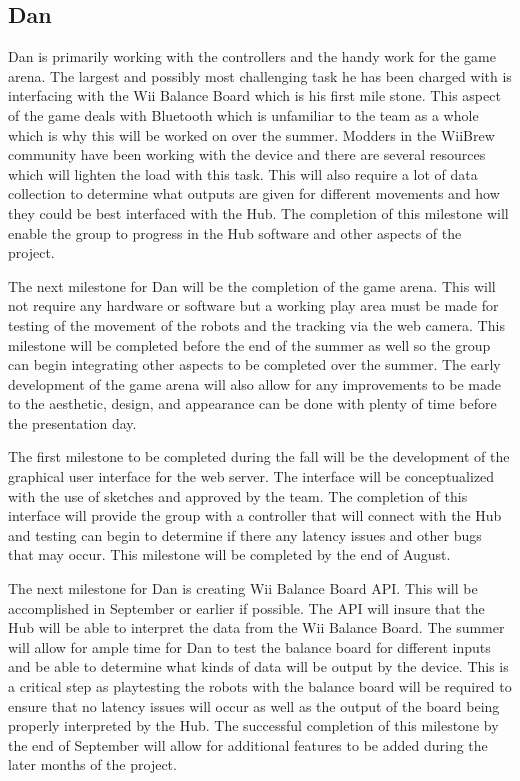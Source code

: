 \documentclass[11pt]{ieeeconf}
\begin{document}
\subsection{Dan}

Dan is primarily working with the controllers and the handy work for the game arena. The largest and possibly most challenging task he has been charged with is interfacing with the Wii Balance Board which is his first mile stone. This aspect of the game deals with Bluetooth which is unfamiliar to the team as a whole which is why this will be worked on over the summer. Modders in the WiiBrew \cite{homebrew} community have been working with the device and there are several resources which will lighten the load with this task. This will also require a lot of data collection to determine what outputs are given for different movements and how they could be best interfaced with the Hub. The completion of this milestone will enable the group to progress in the Hub software and other aspects of the project.

The next milestone for Dan will be the completion of the game arena. This will not require any hardware or software but a working play area must be made for testing of the movement of the robots and the tracking via the web camera. This milestone will be completed before the end of the summer as well so the group can begin integrating other aspects to be completed over the summer. The early development of the game arena will also allow for any improvements to be made to the aesthetic, design, and appearance can be done with plenty of time before the presentation day.

The first milestone to be completed during the fall will be the development of the graphical user interface for the web server. The interface will be conceptualized with the use of sketches and approved by the team. The completion of this interface will provide the group with a controller that will connect with the Hub and testing can begin to determine if there any latency issues and other bugs that may occur. This milestone will be completed by the end of August.  

The next milestone for Dan is creating Wii Balance Board API. This will be accomplished in September or earlier if possible. The API will insure that the Hub will be able to interpret the data from the Wii Balance Board. The summer will allow for ample time for Dan to test the balance board for different inputs and be able to determine what kinds of data will be output by the device. This is a critical step as playtesting the robots with the balance board will be required to ensure that no latency issues will occur as well as the output of the board being properly interpreted by the Hub. The successful completion of this milestone by the end of September will allow for additional features to be added during the later months of the project.  
\end{document}

